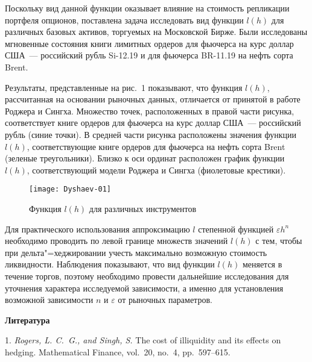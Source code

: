 Поскольку вид данной функции оказывает влияние на стоимость репликации портфеля опционов,  поставлена задача исследовать вид функции $l(h)$ для различных базовых активов, торгуемых на Московской Бирже. Были исследованы мгновенные состояния книги лимитных ордеров для фьючерса на курс доллар США~--- российский рубль Si-12.19 и для фьючерса BR-11.19 на нефть сорта Brent.

Результаты, представленные на рис.~1 показывают, что функция  $l(h)$, рассчитанная на основании рыночных данных, отличается от принятой в работе Роджера и Сингха. Множество точек, расположенных в правой части рисунка, соответствует книге ордеров для фьючерса на курс доллар США~--- российский рубль (синие точки). В средней части рисунка расположены значения функции $l(h)$, соответствующие книге ордеров для фьючерса на нефть сорта Brent (зеленые треугольники). Близко к оси ординат расположен график функции $l(h)$, соответствующий модели Роджера и Сингха (фиолетовые крестики).
\begin{figure}
	\centering
	\texttt{[image: Dyshaev-01]}
	\caption{\footnotesize Функция $l(h)$ для различных инструментов}
	\label{fig:dyshaev-01}
\end{figure}

Для практического использования аппроксимацию $l$ степенной функцией $\varepsilon h^n$ необходимо проводить по левой границе множеств значений $l(h)$ с тем, чтобы при дельта"=хед\-жи\-ро\-ва\-нии учесть максимально возможную стоимость ликвидности. Наблюдения показывают, что вид функции $l(h)$ меняется в течение торгов, поэтому необходимо провести дальнейшие исследования для уточнения характера исследуемой зависимости, а именно для установления возможной зависимости  $n$ и $\varepsilon$ от  рыночных параметров.

\smallskip \centerline {\bf Литература} \nopagebreak

1. {\it Rogers, L. C.~G., and Singh, S.} The cost of illiquidity and its effects on hedging. Mathematical Finance, vol.~20, no.~4, pp.~597--615.

